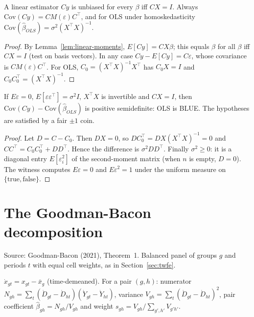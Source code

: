\begin{theorem}
\label{thm:linear-unbiased}
\leanok
{}
A linear estimator $Cy$ is unbiased for every $\beta$ iff $CX = I$. Always $\mathrm{Cov}(Cy) = CM(\varepsilon)C^\top$, and
for OLS under homoskedasticity $\mathrm{Cov}(\hat\beta_{OLS}) = \sigma^2(X^\top X)^{-1}$.
\end{theorem}
\begin{proof}
\leanok
By Lemma~\ref{lem:linear-moments}, $E[Cy] = CX\beta$; this equals $\beta$ for all $\beta$ iff $CX = I$ (test on basis
vectors). In any case $Cy - E[Cy] = C\varepsilon$, whose covariance is $CM(\varepsilon)C^\top$. For OLS,
$C_0 = (X^\top X)^{-1}X^\top$ has $C_0X = I$ and $C_0C_0^\top = (X^\top X)^{-1}$.
\end{proof}

\begin{theorem}
\label{thm:gauss-markov}
\leanok
{}
If $E\varepsilon = 0$, $E[\varepsilon\varepsilon^\top] = \sigma^2 I$, $X^\top X$ is invertible and $CX = I$, then
$\mathrm{Cov}(Cy) - \mathrm{Cov}(\hat\beta_{OLS})$ is positive semidefinite: OLS is BLUE. The hypotheses are satisfied by
a fair $\pm1$ coin.
\end{theorem}
\begin{proof}
\leanok
Let $D = C - C_0$. Then $DX = 0$, so $DC_0^\top = DX(X^\top X)^{-1} = 0$ and
$CC^\top = C_0C_0^\top + DD^\top$. Hence the difference is $\sigma^2DD^\top$. Finally $\sigma^2\ge 0$: it is a
diagonal entry $E[\varepsilon_i^2]$ of the second-moment matrix (when $n$ is empty, $D = 0$). The witness computes
$E\varepsilon = 0$ and $E\varepsilon^2 = 1$ under the uniform measure on $\{\text{true},\text{false}\}$.
\end{proof}

\section{The Goodman-Bacon decomposition}
\label{sec:goodman-bacon}

Source: Goodman-Bacon (2021), Theorem~1. Balanced panel of groups $g$ and periods $t$ with equal cell weights, as in
Section~\ref{sec:twfe}.

\begin{definition}
\label{def:bacon}
\leanok
{}
$\dot x_{gt} = x_{gt} - \bar x_g$ (time-demeaned). For a pair $(g,h)$: numerator
$N_{gh} = \sum_t(\dot D_{gt}-\dot D_{ht})(\dot Y_{gt}-\dot Y_{ht})$, variance
$V_{gh} = \sum_t(\dot D_{gt}-\dot D_{ht})^2$, pair coefficient $\hat\beta_{gh} = N_{gh}/V_{gh}$ and weight
$s_{gh} = V_{gh}/\sum_{g',h'}V_{g'h'}$.
\end{definition}

